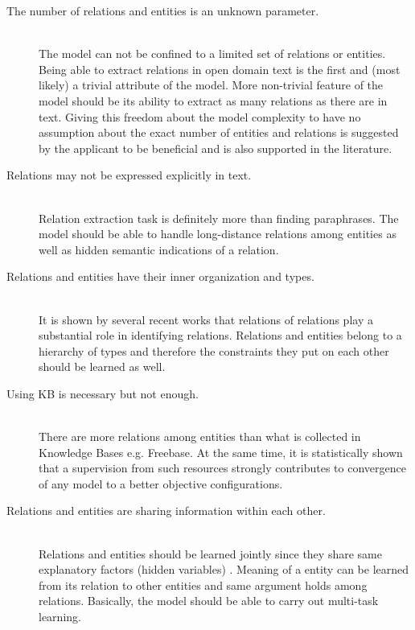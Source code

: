 \documentclass[12pt]{report}
\begin{document}
\begin{description}
  
  \item[The number of relations and entities is an unknown parameter.] \hfill \\
  The model can not be confined to a limited set of relations or entities. Being able to extract relations in
  open domain text is the first and (most likely) a trivial attribute of the model. More non-trivial feature
  of the model should be its ability to extract as many relations as there are in text. 
  Giving this freedom
  about the model complexity to have no assumption about the exact number of entities and relations
  is suggested by the applicant to be beneficial 
   and is also supported in the literature.
   \cite{Mintz2009} \cite{Yates2007}  

  \item[Relations may not be expressed explicitly in text.] \hfill \\
  Relation extraction task is definitely more than finding paraphrases. The model should be able to handle
  long-distance relations among entities as well as hidden semantic indications of a relation. \cite{Poon2009}
  


  \item[Relations and entities have their inner organization and types.] \hfill \\
  It is shown by several recent works that relations of relations play a substantial role in identifying
  relations. Relations and entities belong to a hierarchy of types and therefore the constraints they put on each other
  should be learned as well.\cite{Yao2011} \cite{Alfonseca2012} \cite{Nakashole2012a}

  \item[Using KB is necessary but not enough.] \hfill \\
  There are more relations among entities than what is collected in 
  Knowledge Bases e.g. Freebase. At the same time, it is statistically shown that a supervision
  from such resources strongly contributes to convergence of any model to a better 
  objective configurations.\cite{Yao2011} \cite{Mintz2009}

  \item[Relations and entities are sharing information within each other.] \hfill \\
  Relations and entities should be learned jointly since they share same explanatory factors (hidden variables)
  . Meaning of a entity can be learned from its relation to other entities and same argument holds among relations.
  Basically, the model should be able to carry out multi-task learning. \cite{Yao2011} 
    
\end{description}
\end{document}
